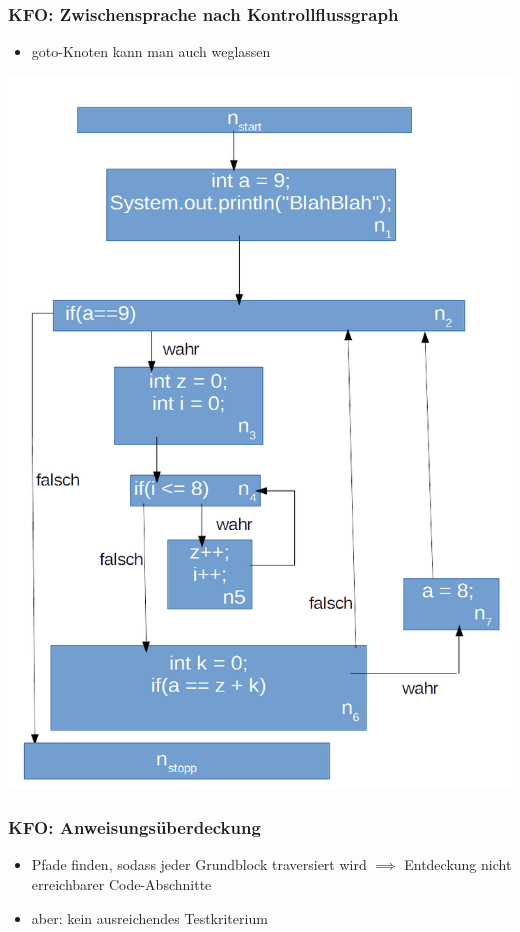 \documentclass[18pt]{beamer}
\begin{document}
	\begin{frame}
		\frametitle{KFO: Zwischensprache nach Kontrollflussgraph}
		\begin{itemize}
			\item goto-Knoten kann man auch weglassen
		\end{itemize}
		\centering \includegraphics[scale=0.2]{./pics/tut5/test-without-goto.png}
		\pause
	\end{frame}

	\begin{frame}
		\frametitle{KFO: Anweisungsüberdeckung}
		\begin{itemize}
			\item Pfade finden, sodass jeder Grundblock traversiert wird \pause
			\linebreak $\implies$ Entdeckung nicht erreichbarer Code-Abschnitte \pause
			\item aber: kein ausreichendes Testkriterium
		\end{itemize}
	\end{frame}
\end{document}
